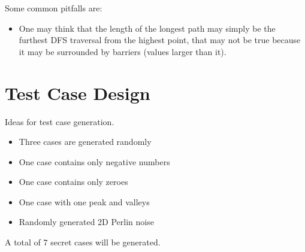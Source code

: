 \documentclass[a4paper,11pt]{article}
\begin{document}
Some common pitfalls are: 

\begin{itemize}
    \item One may think that the length of the longest path may simply be the furthest DFS traversal from the highest point, that may not be true because it may be surrounded by barriers (values larger than it). 
\end{itemize}

\section{Test Case Design}

Ideas for test case generation.\\
\begin{itemize}
    \item Three cases are generated randomly
    \item One case contains only negative numbers
    \item One case contains only zeroes
    \item One case with one peak and valleys
    \item Randomly generated 2D Perlin noise
\end{itemize}

A total of $7$ secret cases will be generated.
\end{document}
